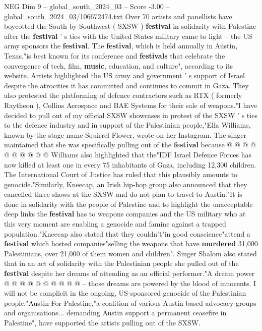 \begin{textsample}{NEG Dim 9 – global\_south\_2024\_03 – Score -3.00 – global\_south\_2024\_03/106672474.txt}  \label{ex:f9_neg_378}
Over 70 artists and panellists have boycotted the South by Southwest ( SXSW ) \textbf{festival} in solidarity with Palestine after the \textbf{festival} ' s ties with the United States military came to light -- the US army sponsors the \textbf{festival}.
The \textbf{festival}, which is held annually in Austin, Texas,"is best known for its conference and \textbf{festivals} that celebrate the convergence of tech, film, \textbf{music}, education, and culture", according to its website.
Artists highlighted the US army and government ' s support of Israel despite the atrocities it has committed and continues to commit in Gaza.
They also protested the platforming of defence contractors such as RTX ( formerly Raytheon ), Collins Aerospace and BAE Systems for their sale of weapons."I have decided to pull out of my official SXSW showcases in protest of the SXSW ' s ties to the defence industry and in support of the Palestinian people,"Ella Williams, known by the stage name Squirrel Flower, wrote on her Instagram.
The singer maintained that she was specifically pulling out of the \textbf{festival} because @ @ @ @ @ @ @ @ @ @ Williams also highlighted that the"IDF Israel Defence Forces has now killed at least one in every 75 inhabitants of Gaza, including 12,300 children.
The International Court of Justice has ruled that this plausibly amounts to genocide."Similarly, Kneecap, an Irish hip-hop group also announced that they cancelled three shows at the SXSW and do not plan to travel to Austin."It is done in solidarity with the people of Palestine and to highlight the unacceptable deep links the \textbf{festival} has to weapons companies and the US military who at this very moment are enabling a genocide and famine against a trapped population."Kneecap also stated that they couldn't"in good conscience"attend a \textbf{festival} which hosted companies"selling the weapons that have \textbf{murdered} 31,000 Palestinians, over 21,000 of them women and children".
Singer Shalom also stated that in an act of solidarity with the Palestinian people she pulled out of the \textbf{festival} despite her dreams of attending as an official performer."A dream power @ @ @ @ @ @ @ @ @ @ -- those dreams are powered by the blood of innocents.
I will not be complicit in the ongoing, US-sponsored genocide of the Palestinian people."Austin For Palestine,"a coalition of various Austin-based advocacy groups and organisations... demanding Austin support a permanent ceasefire in Palestine", have supported the artists pulling out of the SXSW.

\end{textsample}
